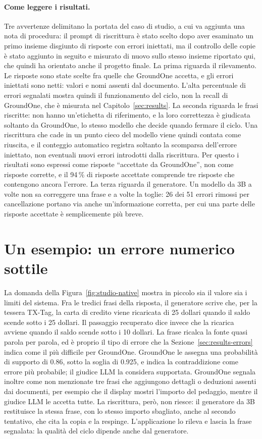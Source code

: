 \paragraph{Come leggere i risultati.} Tre avvertenze delimitano la portata del caso di studio, a cui va aggiunta una nota di procedura: il prompt di riscrittura è stato scelto dopo aver esaminato un primo insieme disgiunto di risposte con errori iniettati, ma il controllo delle copie è stato aggiunto in seguito e misurato di nuovo sullo stesso insieme riportato qui, che quindi ha orientato anche il progetto finale. La prima riguarda il
rilevamento. Le risposte sono state scelte fra quelle che GroundOne accetta, e gli errori iniettati sono netti: valori e
nomi assenti dal documento. L'alta percentuale di errori segnalati mostra quindi il funzionamento del ciclo, non la
recall di GroundOne, che è misurata nel Capitolo~\ref{sec:results}. La seconda riguarda le frasi riscritte: non hanno
un'etichetta di riferimento, e la loro correttezza è giudicata soltanto da GroundOne, lo stesso modello che decide quando
fermare il ciclo. Una riscrittura che cade in un punto cieco del modello viene quindi contata come riuscita, e il conteggio
automatico registra soltanto la scomparsa dell'errore iniettato, non eventuali nuovi errori introdotti dalla riscrittura.
Per questo i risultati sono espressi come risposte ``accettate da GroundOne'', non come risposte corrette, e il 94\,\% di risposte accettate comprende tre risposte che contengono ancora l'errore. La terza riguarda il generatore. Un modello da 3B
a volte non sa correggere una frase e a volte la toglie: 26 dei 51 errori rimossi per cancellazione portano via anche
un'informazione corretta, per cui una parte delle risposte accettate è semplicemente più breve.

\section{Un esempio: un errore numerico sottile}
\label{sec:studio-example}

La domanda della Figura~\ref{fig:studio-native} mostra in piccolo sia il valore sia i limiti del sistema. Fra le tredici
frasi della risposta, il generatore scrive che, per la tessera TX-Tag, la carta di credito viene ricaricata di 25 dollari
quando il saldo scende sotto i 25 dollari. Il passaggio recuperato dice invece che la ricarica avviene quando il saldo
scende sotto i 10 dollari. La frase ricalca la fonte quasi parola per parola, ed è proprio il tipo di errore che la
Sezione~\ref{sec:results-errors} indica come il più difficile per GroundOne. GroundOne le assegna una probabilità di
supporto di 0.86, sotto la soglia di 0.925, e indica la contraddizione come errore più probabile; il giudice LLM
la considera supportata. GroundOne segnala inoltre come non menzionate tre frasi che aggiungono dettagli o deduzioni
assenti dai documenti, per esempio che il display mostri l'importo del pedaggio, mentre il giudice LLM le accetta tutte.
La riscrittura, però, non riesce: il generatore da 3B restituisce la stessa frase, con lo stesso importo sbagliato, anche al secondo tentativo, che cita la copia e la respinge. L'applicazione lo rileva e lascia la frase segnalata: la qualità del ciclo dipende anche dal generatore.

